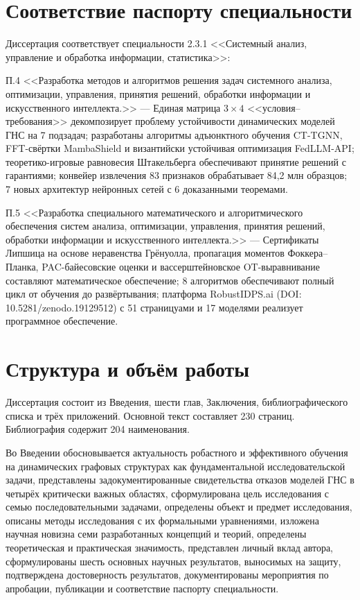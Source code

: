 \section*{Соответствие паспорту специальности}

Диссертация соответствует специальности 2.3.1 <<Системный анализ, управление и обработка информации, статистика>>:

\noindent П.4 <<Разработка методов и алгоритмов решения задач системного анализа, оптимизации, управления, принятия решений, обработки информации и искусственного интеллекта.>> --- Единая матрица $3\times4$ <<условия--требования>> декомпозирует проблему устойчивости динамических моделей ГНС на 7 подзадач; разработаны алгоритмы адъюнктного обучения CT-TGNN, FFT-свёртки MambaShield и византийски устойчивая оптимизация FedLLM-API; теоретико-игровые равновесия Штакельберга обеспечивают принятие решений с гарантиями; конвейер извлечения 83 признаков обрабатывает 84,2 млн образцов; 7 новых архитектур нейронных сетей с 6 доказанными теоремами.

\noindent П.5 <<Разработка специального математического и алгоритмического обеспечения систем анализа, оптимизации, управления, принятия решений, обработки информации и искусственного интеллекта.>> --- Сертификаты Липшица на основе неравенства Грёнуолла, пропагация моментов Фоккера--Планка, PAC-байесовские оценки и вассерштейновское OT-выравнивание составляют математическое обеспечение; 8 алгоритмов обеспечивают полный цикл от обучения до развёртывания; платформа RobustIDPS.ai (DOI: 10.5281/zenodo.19129512) с 51 страницуами и 17 моделями реализует программное обеспечение.

\section*{Структура и объём работы}

Диссертация состоит из Введения, шести глав, Заключения, библиографического списка и трёх приложений. Основной текст составляет 230 страниц. Библиография содержит 204 наименования.

Во Введении обосновывается актуальность робастного и эффективного обучения на динамических графовых структурах как фундаментальной исследовательской задачи, представлены задокументированные свидетельства отказов моделей ГНС в четырёх критически важных областях, сформулирована цель исследования с семью последовательными задачами, определены объект и предмет исследования, описаны методы исследования с их формальными уравнениями, изложена научная новизна семи разработанных концепций и теорий, определены теоретическая и практическая значимость, представлен личный вклад автора, сформулированы шесть основных научных результатов, выносимых на защиту, подтверждена достоверность результатов, документированы мероприятия по апробации, публикации и соответствие паспорту специальности.

